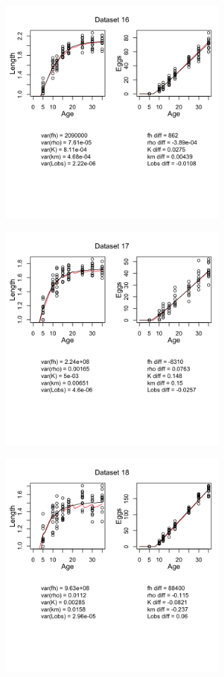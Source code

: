 \documentclass[12pt,reqno,final,pdftex]{amsart}\usepackage[]{graphicx}\usepackage[]{color}
\newenvironment{knitrout}{}{} %
\theoremstyle{plain}
\numberwithin{equation}{part}
\begin{document}
\begin{knitrout}
\includegraphics[width=0.6\textwidth]{figure/unnamed-chunk-5-16} \hfill{}




\includegraphics[width=0.6\textwidth]{figure/unnamed-chunk-5-17} \hfill{}




\includegraphics[width=0.6\textwidth]{figure/unnamed-chunk-5-18} \hfill{}





\end{knitrout}
\end{document}
